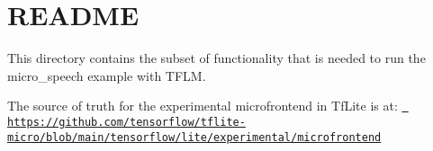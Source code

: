 \chapter{README}
\hypertarget{md__arduino_2_get_started_with_machine_learning_on_arduino_2tflite-micro-main_2tensorflow_2lite_3f895022cc664f7fcc872d44736edffe}{}\label{md__arduino_2_get_started_with_machine_learning_on_arduino_2tflite-micro-main_2tensorflow_2lite_3f895022cc664f7fcc872d44736edffe}
This directory contains the subset of functionality that is needed to run the micro\+\_\+speech example with TFLM.

The source of truth for the experimental microfrontend in Tf\+Lite is at\+: \href{https://github.com/tensorflow/tflite-micro/blob/main/tensorflow/lite/experimental/microfrontend}{\texttt{ https\+://github.\+com/tensorflow/tflite-\/micro/blob/main/tensorflow/lite/experimental/microfrontend}} 